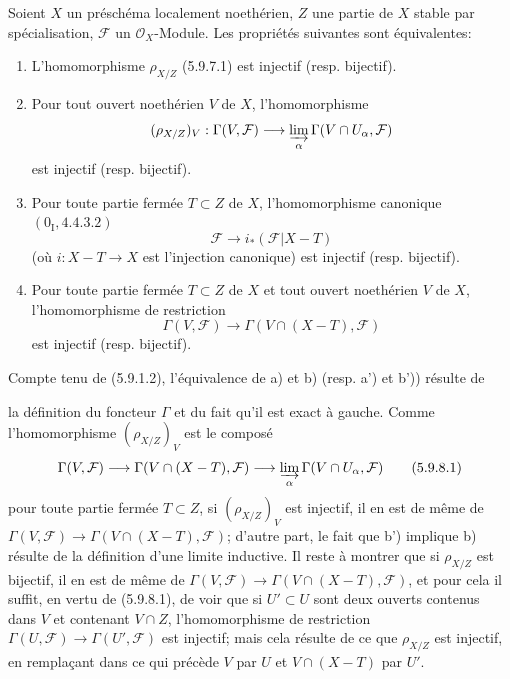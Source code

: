 \begin{proposition}[5.9.8]
\label{IV.2.s5.9.8-fr}
Soient $X$ un préschéma localement noethérien, $Z$ une partie de $X$ stable
par spécialisation, $\mathcal F$ un $\mathcal O_X$-Module. Les propriétés
suivantes sont équivalentes:
\begin{enumerate}
\item[a)] L'homomorphisme $\rho_{X/Z}$ (5.9.7.1) est injectif
(resp. bijectif).
\item[b)] Pour tout ouvert noethérien $V$ de $X$, l'homomorphisme
\[
(\rho_{X/Z})_V:\Gamma(V,\mathcal F)\longrightarrow
\varinjlim_\alpha\Gamma(V\cap U_\alpha,\mathcal F)
\]
est injectif (resp. bijectif).
\item[a')] Pour toute partie fermée $T\subset Z$ de $X$, l'homomorphisme
canonique $(0_{\mathrm I},4.4.3.2)$
\[
\mathcal F\longrightarrow i_*(\mathcal F|X-T)
\]
(où $i:X-T\to X$ est l'injection canonique) est injectif
(resp. bijectif).
\item[b')] Pour toute partie fermée $T\subset Z$ de $X$ et tout ouvert
noethérien $V$ de $X$, l'homomorphisme de restriction
\[
\Gamma(V,\mathcal F)\longrightarrow
\Gamma(V\cap(X-T),\mathcal F)
\]
est injectif (resp. bijectif).
\end{enumerate}
\end{proposition}

Compte tenu de (5.9.1.2), l'équivalence de a) et b) (resp. a') et b'))
résulte de

la définition du foncteur $\Gamma$ et du fait qu'il est exact à gauche.
Comme l'homomorphisme $(\rho_{X/Z})_V$ est le composé
\begin{equation}
\Gamma(V,\mathcal F)\longrightarrow
\Gamma(V\cap(X-T),\mathcal F)\longrightarrow
\varinjlim_\alpha\Gamma(V\cap U_\alpha,\mathcal F)
\tag{5.9.8.1}\label{IV.2.s5.9.8.1-fr}
\end{equation}
pour toute partie fermée $T\subset Z$, si $(\rho_{X/Z})_V$ est injectif, il
en est de même de
$\Gamma(V,\mathcal F)\to\Gamma(V\cap(X-T),\mathcal F)$; d'autre part, le
fait que b') implique b) résulte de la définition d'une limite inductive. Il
reste à montrer que si $\rho_{X/Z}$ est bijectif, il en est de même de
$\Gamma(V,\mathcal F)\to\Gamma(V\cap(X-T),\mathcal F)$, et pour cela il
suffit, en vertu de (5.9.8.1), de voir que si $U'\subset U$ sont deux
ouverts contenus dans $V$ et contenant $V\cap Z$, l'homomorphisme de
restriction $\Gamma(U,\mathcal F)\to\Gamma(U',\mathcal F)$ est injectif;
mais cela résulte de ce que $\rho_{X/Z}$ est injectif, en remplaçant dans ce
qui précède $V$ par $U$ et $V\cap(X-T)$ par $U'$.

